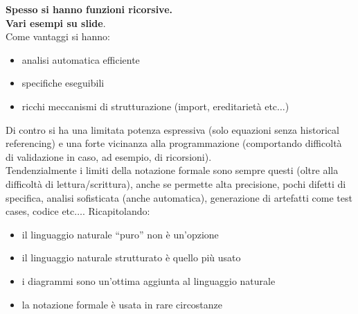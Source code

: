 \documentclass[a4paper,12pt, oneside]{book}
\begin{document}
\textbf{Spesso si hanno funzioni ricorsive.}\\
\textbf{Vari esempi su slide}.\\
Come vantaggi si hanno:
\begin{itemize}
  \item analisi automatica efficiente
  \item specifiche eseguibili
  \item ricchi meccanismi di strutturazione (import, ereditarietà etc$\ldots$)
\end{itemize}
Di contro si ha una limitata potenza espressiva (solo equazioni senza historical
referencing) e una forte vicinanza alla programmazione (comportando difficoltà 
di validazione in caso, ad esempio, di ricorsioni).\\
Tendenzialmente i limiti della notazione formale sono sempre questi (oltre alla
difficoltà di lettura/scrittura), anche se permette alta precisione, pochi
difetti di specifica, analisi sofisticata (anche automatica), generazione di
artefatti come test cases, codice etc$\ldots$.
Ricapitolando:
\begin{itemize}
  \item il linguaggio naturale ``puro'' non è un'opzione
  \item il linguaggio naturale strutturato è quello più usato
  \item i diagrammi sono un'ottima aggiunta al linguaggio naturale
  \item la notazione formale è usata in rare circostanze
\end{itemize}
\end{document}
